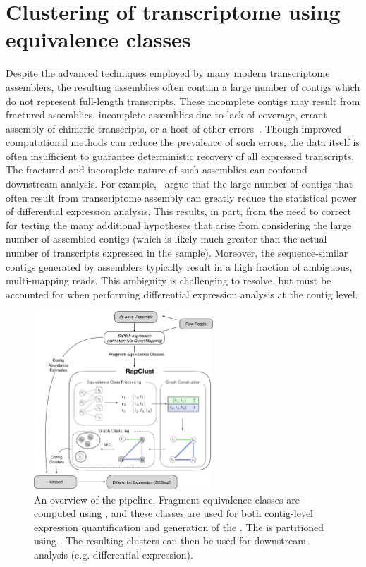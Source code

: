 \chapter{Clustering of \denovo transcriptome using equivalence classes}

Despite the advanced techniques employed by many modern \denovo transcriptome assemblers, the resulting assemblies often contain a large number of contigs which do not represent full-length transcripts.  These incomplete contigs may result from fractured assemblies, incomplete assemblies due to lack of coverage, errant assembly of chimeric transcripts, or a host of other errors~\cite{transrate}.  Though improved computational methods can reduce the prevalence of such errors, the data itself is often insufficient to guarantee deterministic recovery of all expressed transcripts.  The fractured and incomplete nature of such \denovo assemblies can confound downstream analysis.  For example,~\citet{corset} argue that the large number of contigs that often result from \denovo transcriptome assembly can greatly reduce the statistical power of differential expression analysis.  This results, in part, from the need to correct for testing the many additional hypotheses that arise from considering the large number of assembled contigs (which is likely much greater than the actual number of transcripts expressed in the sample).  Moreover, the sequence-similar contigs generated by \denovo assemblers typically result in a high fraction of ambiguous, multi-mapping reads.  This ambiguity is challenging to resolve, but must be accounted for when performing differential expression analysis at the contig level.

\begin{figure}[!ht]
\includegraphics[width=0.6\textwidth]{Figures/overview}
\centering
\caption{\label{fig:overview}An overview of the \rapclust pipeline. Fragment equivalence classes are computed using \qm, and these classes are used for both contig-level expression quantification and generation of the \ambiggraph. The \ambiggraph is partitioned using \mcl.  The resulting clusters can then be used for downstream analysis (e.g. differential expression).}
\end{figure}

